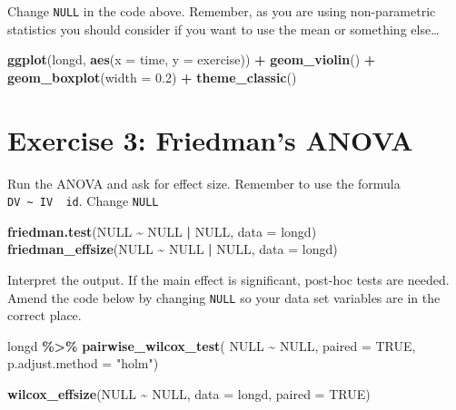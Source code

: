 \documentclass[
]{book}
\newenvironment{Shaded}{\begin{snugshade}}{\end{snugshade}}
\newcommand{\AttributeTok}[1]{\textcolor[rgb]{0.13,0.29,0.53}{#1}}
\newcommand{\ConstantTok}[1]{\textcolor[rgb]{0.56,0.35,0.01}{#1}}
\newcommand{\FloatTok}[1]{\textcolor[rgb]{0.00,0.00,0.81}{#1}}
\newcommand{\FunctionTok}[1]{\textcolor[rgb]{0.13,0.29,0.53}{\textbf{#1}}}
\newcommand{\NormalTok}[1]{#1}
\newcommand{\SpecialCharTok}[1]{\textcolor[rgb]{0.81,0.36,0.00}{\textbf{#1}}}
\newcommand{\StringTok}[1]{\textcolor[rgb]{0.31,0.60,0.02}{#1}}
\let\oldsection\section
\renewcommand{\section}{\needspace{5\baselineskip}\oldsection}
\begin{document}
Change \texttt{NULL} in the code above. Remember, as you are using non-parametric statistics you should consider if you want to use the mean or something else\ldots{}

\begin{Shaded}
\begin{Highlighting}[]
\FunctionTok{ggplot}\NormalTok{(longd, }\FunctionTok{aes}\NormalTok{(}\AttributeTok{x =}\NormalTok{ time, }\AttributeTok{y =}\NormalTok{ exercise)) }\SpecialCharTok{+}
  \FunctionTok{geom\_violin}\NormalTok{() }\SpecialCharTok{+}
  \FunctionTok{geom\_boxplot}\NormalTok{(}\AttributeTok{width =} \FloatTok{0.2}\NormalTok{) }\SpecialCharTok{+}
  \FunctionTok{theme\_classic}\NormalTok{()}
\end{Highlighting}
\end{Shaded}

\section{Exercise 3: Friedman's ANOVA}\label{exercise-3-friedmans-anova}

Run the ANOVA and ask for effect size. Remember to use the formula \texttt{DV\ \textasciitilde{}\ IV\ \textbar{}\ id}. Change \texttt{NULL}

\begin{Shaded}
\begin{Highlighting}[]
\FunctionTok{friedman.test}\NormalTok{(}\ConstantTok{NULL} \SpecialCharTok{\textasciitilde{}} \ConstantTok{NULL} \SpecialCharTok{|} \ConstantTok{NULL}\NormalTok{, }\AttributeTok{data =}\NormalTok{ longd)}
\FunctionTok{friedman\_effsize}\NormalTok{(}\ConstantTok{NULL} \SpecialCharTok{\textasciitilde{}} \ConstantTok{NULL} \SpecialCharTok{|} \ConstantTok{NULL}\NormalTok{, }\AttributeTok{data =}\NormalTok{ longd)}
\end{Highlighting}
\end{Shaded}

Interpret the output. If the main effect is significant, post-hoc tests are needed. Amend the code below by changing \texttt{NULL} so your data set variables are in the correct place.

\begin{Shaded}
\begin{Highlighting}[]
\NormalTok{longd }\SpecialCharTok{\%\textgreater{}\%}
  \FunctionTok{pairwise\_wilcox\_test}\NormalTok{(}
    \ConstantTok{NULL} \SpecialCharTok{\textasciitilde{}} \ConstantTok{NULL}\NormalTok{,}
    \AttributeTok{paired =} \ConstantTok{TRUE}\NormalTok{,}
    \AttributeTok{p.adjust.method =} \StringTok{"holm"}\NormalTok{)}
    
\FunctionTok{wilcox\_effsize}\NormalTok{(}\ConstantTok{NULL} \SpecialCharTok{\textasciitilde{}} \ConstantTok{NULL}\NormalTok{, }\AttributeTok{data =}\NormalTok{ longd, }\AttributeTok{paired =} \ConstantTok{TRUE}\NormalTok{)}
\end{Highlighting}
\end{Shaded}
\end{document}
